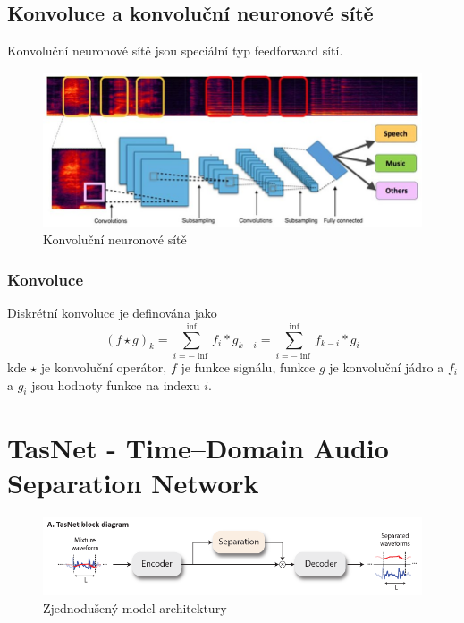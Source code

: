 \section{Konvoluce a konvoluční neuronové sítě}
Konvoluční neuronové sítě jsou speciální typ feedforward sítí.
\begin{figure}[H]
    \centering
    \includegraphics[scale=0.5]{obrazky-figures/conv_nn_audio.jpg}
    \caption{\label{fig:conv_nn}Konvoluční neuronové sítě}
\end{figure}


\subsection{Konvoluce}
Diskrétní konvoluce je definována jako
\begin{equation}
   (f \star g)_k = \sum_{i=-\inf}^\inf f_i * g_{k-i} = \sum_{i=-\inf}^\inf f_{k-i} * g_{i}
\end{equation}
kde $\star$ je konvoluční operátor, $f$ je funkce signálu, funkce $g$ je konvoluční jádro a $f_i$ a $g_i$ jsou hodnoty funkce na indexu $i$.








\chapter{TasNet - Time--Domain Audio Separation Network}
\label{tasnet}
\begin{figure}[H]
    \centering
    \includegraphics[scale=0.5]{obrazky-figures/tasnet-pipe.png}
    \caption{\label{fig:tasnet-pipe}Zjednodušený model architektury}
\end{figure}


